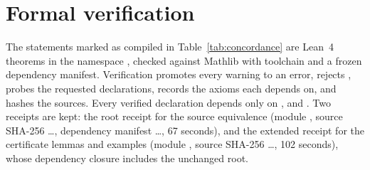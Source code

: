 \documentclass[11pt,a4paper]{article}
\theoremstyle{plain}
\theoremstyle{definition}
\theoremstyle{remark}
\begin{document}
\section{Formal verification}\label{sec:formal}

The statements marked as compiled in Table~\ref{tab:concordance} are Lean~4 theorems \citep{demoura2021} in the namespace , checked against Mathlib \citep{mathlib2020} with toolchain  and a frozen dependency manifest. Verification promotes every warning to an error, rejects , probes the requested declarations, records the axioms each depends on, and hashes the sources. Every verified declaration depends only on ,  and . Two receipts are kept: the root receipt for the source equivalence (module , source SHA-256 \ldots, dependency manifest \ldots, 67 seconds), and the extended receipt for the certificate lemmas and examples (module , source SHA-256 \ldots, 102 seconds), whose dependency closure includes the unchanged root.
\end{document}
